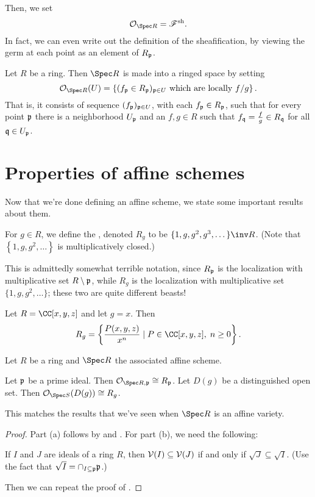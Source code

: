 \documentclass[11pt]{scrreprt}
\begin{document}
Then, we set \[ \OO_{\Spec R} = \SF\sh. \]
In fact, we can even write out the definition of the sheafification,
by viewing the germ at each point as an element of $R_\mathfrak p$.
\begin{definition}
	Let $R$ be a ring. Then $\Spec R$ is made into a ringed space by setting
	\[ \OO_{\Spec R}(U) 
		= \left\{ (f_\pp \in R_\pp)_{\pp \in U}
		\text{ which are locally $f/g$} \right\}. \]
	That is, it consists of sequence $(f_\mathfrak p)_{\mathfrak p \in U}$, with
	each $f_\mathfrak p \in R_\mathfrak p$, such that for every point $\mathfrak p$ there
	is a neighborhood $U_\mathfrak p$ and an $f,g \in R$ such that
	$f_\mathfrak q = \frac fg \in R_\mathfrak q$ for all $\mathfrak q \in U_\mathfrak p$.
\end{definition}

\section{Properties of affine schemes}
Now that we're done defining an affine scheme,
we state some important results about them.

\begin{definition}
	For $g \in R$, we define the ,
	denoted $R_g$ to be $\{1, g, g^2, g^3, \dots\}\inv R$.
	(Note that $\left\{ 1, g, g^2, \dots \right\}$ is multiplicatively closed.)
\end{definition}
This is admittedly somewhat terrible notation, since $R_\mathfrak p$
is the localization with multiplicative set $R \setminus \mathfrak p$,
while $R_g$ is the localization with multiplicative set $\{1,g,g^2,\dots\}$;
these two are quite different beasts!

\begin{example}
	Let $R = \CC[x,y,z]$ and let $g = x$.
	Then
	\[ R_g = \left\{ \frac{P(x,y,z)}{x^n} \mid
		P \in \CC[x,y,z], \; n \ge 0 \right\}. \]
\end{example}
\begin{theorem}
	Let $R$ be a ring and $\Spec R$ the associated affine scheme.
	\begin{enumerate}[(a)]
		\ii Let $\mathfrak p$ be a prime ideal.
		Then $\OO_{\Spec R, \pp} \cong R_\pp$.
		\ii Let $D(g)$ be a distinguished open set.
		Then $\OO_{\Spec S}(D(g)) \cong R_g$.
	\end{enumerate}
\end{theorem}
This matches the results that we've seen when $\Spec R$ is an affine variety.
\begin{proof}
	Part (a) follows by 
	and .
	For part (b), we need the following:
	\begin{ques}
		If $I$ and $J$ are ideals of a ring $R$,
		then $\mathcal V(I) \subseteq \mathcal V(J)$ if and only if
		$\sqrt{J} \subseteq \sqrt{I}$.
		(Use the fact that $\sqrt I = \cap_{I \subseteq \mathfrak p} \mathfrak p$.)
	\end{ques}
	Then we can repeat the proof of .
\end{proof}
\end{document}
